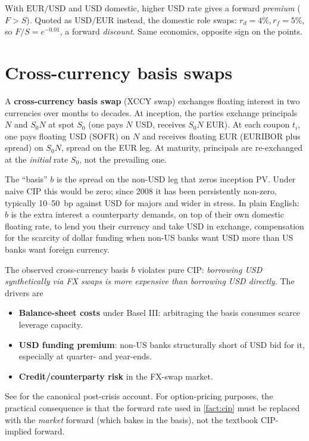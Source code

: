 \begin{pitfallbox}
With $\mathrm{EUR}/\mathrm{USD}$ and USD domestic, higher USD rate
gives a forward \emph{premium} ($F > S$).  Quoted as
$\mathrm{USD}/\mathrm{EUR}$ instead, the domestic role swaps:
$r_d = 4\%, r_f = 5\%$, so $F/S = e^{-0.01}$, a forward
\emph{discount}.  Same economics, opposite sign on the points.
\end{pitfallbox}


\section{Cross-currency basis swaps}
\label{sec:xccy_basis}

A \textbf{cross-currency basis swap} (XCCY swap) exchanges floating
interest in two currencies over months to decades.  At inception,
the parties exchange principals $N$ and $S_0 N$ at spot $S_0$ (one
pays $N$ USD, receives $S_0 N$ EUR).  At each coupon $t_i$, one pays
floating USD (SOFR) on $N$ and receives floating EUR (EURIBOR plus
spread) on $S_0 N$, spread on the EUR leg.  At maturity, principals
are re-exchanged at the \emph{initial} rate $S_0$, not the
prevailing one.

The ``basis'' $b$ is the spread on the non-USD leg that zeros
inception PV.  Under naive CIP this would be zero; since 2008 it has
been persistently non-zero, typically 10--50~bp against USD for
majors and wider in stress.  In plain English: $b$ is the extra
interest a counterparty demands, on top of their own domestic
floating rate, to lend you their currency and take USD in exchange,
compensation for the scarcity of dollar funding when non-US
banks want USD more than US banks want foreign currency.

\begin{keyfactbox}
\label{fact:cip_deviations}
The observed cross-currency basis $b$ violates pure CIP:
\emph{borrowing USD synthetically via FX swaps is more expensive
than borrowing USD directly.}  The drivers are
\begin{itemize}
  \item \textbf{Balance-sheet costs} under Basel III: arbitraging
    the basis consumes scarce leverage capacity.
  \item \textbf{USD funding premium}: non-US banks structurally
    short of USD bid for it, especially at quarter- and year-ends.
  \item \textbf{Credit/counterparty risk} in the FX-swap market.
\end{itemize}
See \citet{borio2016covered} for the canonical post-crisis account.
For option-pricing purposes, the practical consequence is that the
forward rate used in \cref{fact:cip} must be replaced with the
\emph{market} forward (which bakes in the basis), not the
textbook CIP-implied forward.
\end{keyfactbox}

